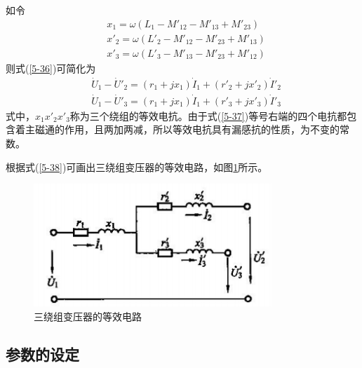\documentclass{book}
\begin{document}
如令
\begin{align}
& {{x}_{1}}=\omega \left( {{L}_{1}}-{{{{M}'}}_{12}}-{{{{M}'}}_{13}}+{{{{M}'}}_{23}} \right) \\ 
& {{{{x}'}}_{2}}=\omega \left( {{{{L}'}}_{2}}-{{{{M}'}}_{12}}-{{{{M}'}}_{23}}+{{{{M}'}}_{13}} \right) \\ 
& {{{{x}'}}_{3}}=\omega \left( {{{{L}'}}_{3}}-{{{{M}'}}_{13}}-{{{{M}'}}_{23}}+{{{{M}'}}_{12}} \right) 
\label{5-37}
\end{align}
则式(\ref{5-36})可简化为
\begin{align}
& {{{\dot{U}}}_{1}}-{{{{\dot{U}}'}}_{2}}=\left( {{r}_{1}}+j{{x}_{1}} \right){{{\dot{I}}}_{1}}+\left( {{{{r}'}}_{2}}+j{{{{x}'}}_{2}} \right){{{{\dot{I}}'}}_{2}} \\ 
& {{{\dot{U}}}_{1}}-{{{{\dot{U}}'}}_{3}}=\left( {{r}_{1}}+j{{x}_{1}} \right){{{\dot{I}}}_{1}}+\left( {{{{r}'}}_{3}}+j{{{{x}'}}_{3}} \right){{{{\dot{I}}'}}_{3}} 
\label{5-38}
\end{align} 
式中，${{x}_{1}}{{{x}'}_{2}}{{{x}'}_{3}}$称为三个绕组的等效电抗。由于式(\ref{5-37})等号右端的四个电抗都包含着主磁通的作用，且两加两减，所以等效电抗具有漏感抗的性质，为不变的常数。

根据式(\ref{5-38})可画出三绕组变压器的等效电路，如图\ref{fig_5-9}所示。

\begin{figure}[H]
	\centering
	\includegraphics[width=0.80\textwidth]{5-9.png}
	\caption{三绕组变压器的等效电路}
	\label{fig_5-9}
\end{figure}

\subsection{参数的设定}
\end{document}
